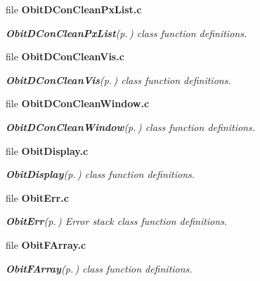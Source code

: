 \begin{CompactItemize}
\item 
file {\bf Obit\-DCon\-Clean\-Px\-List.c}
\begin{CompactList}\small\item\em {\bf Obit\-DCon\-Clean\-Px\-List}{\rm (p.\,\pageref{structObitDConCleanPxList})} class function definitions. \item\end{CompactList}

\item 
file {\bf Obit\-DCon\-Clean\-Vis.c}
\begin{CompactList}\small\item\em {\bf Obit\-DCon\-Clean\-Vis}{\rm (p.\,\pageref{structObitDConCleanVis})} class function definitions. \item\end{CompactList}

\item 
file {\bf Obit\-DCon\-Clean\-Window.c}
\begin{CompactList}\small\item\em {\bf Obit\-DCon\-Clean\-Window}{\rm (p.\,\pageref{structObitDConCleanWindow})} class function definitions. \item\end{CompactList}

\item 
file {\bf Obit\-Display.c}
\begin{CompactList}\small\item\em {\bf Obit\-Display}{\rm (p.\,\pageref{structObitDisplay})} class function definitions. \item\end{CompactList}

\item 
file {\bf Obit\-Err.c}
\begin{CompactList}\small\item\em {\bf Obit\-Err}{\rm (p.\,\pageref{structObitErr})} Error stack class function definitions. \item\end{CompactList}

\item 
file {\bf Obit\-FArray.c}
\begin{CompactList}\small\item\em {\bf Obit\-FArray}{\rm (p.\,\pageref{structObitFArray})} class function definitions. \item\end{CompactList}


\end{CompactItemize}
